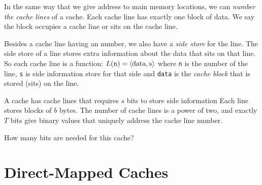 In the same way that we give address to main memory locations, 
we can \textit{number the cache lines} of a cache. 
Each cache line has exactly one block of data.
We say the block occupies a cache line or sits on the cache line. 

Besides a cache line having an number, we also have a \textit{side store} for the 
line. The side store of a line stores extra information about the data that sits 
on that line. So each cache line is a function: 
$L(\text{\lstinline{n}}) =
\langle \text{\lstinline{data}}, \text{\lstinline{s}} \rangle$
where \lstinline{n} is the number of the line,
\lstinline{s} is side information store for that side and
\lstinline{data} is the \textit{cache block} that is stored (sits) on the line.

\begin{example}
A cache has cache lines that requires $s$ bits to store side information 
Each line stores blocks of $b$ bytes.
The number of cache lines is a power of two, and exactly $T$ bits 
give binary values that uniquely address the cache line number. 

How many bits are needed for this cache?
\end{example}




\section{Direct-Mapped Caches}



\begin{figure}[h]
\end{figure} 

\frmrule

